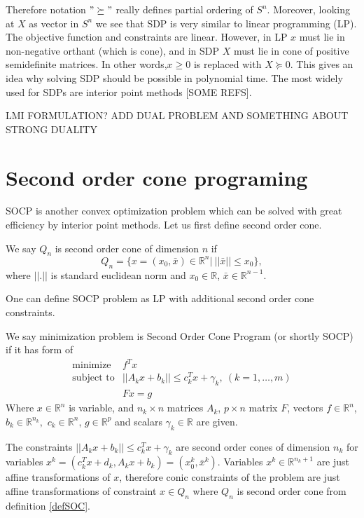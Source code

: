 \documentclass[10pt,oneside]{book}
\theoremstyle{definition}
\begin{document}
Therefore notation $"\succeq"$ really defines partial ordering of $S^n$. 
Moreover, looking at $X$ as vector in $S^n$ we see that SDP is very similar to linear programming (LP). The objective function and constraints are linear. However, in LP $x$ must lie in non-negative orthant (which is cone), and in SDP $X$ must lie in cone of positive semidefinite matrices. In other words,$x\geq 0$ is replaced with $X\succeq 0$. 
This gives an idea why solving SDP should be possible in polynomial time. The most widely used for SDPs are interior point methods [SOME REFS].

LMI FORMULATION?
ADD DUAL PROBLEM AND SOMETHING ABOUT STRONG DUALITY 

\section{Second order cone programing}



SOCP is another convex optimization problem which can be solved with great efficiency by interior point methods. Let us first define second order cone.

\label{defSOC} We say $Q_n$ is second order cone of dimension $n$ if 
$$Q_n=\{x = (x_0,\bar{x}) \in \mathbb{R}^n|\ ||\bar{x}||\leq x_0\},$$
where $||.|| $ is standard euclidean norm and $x_0\in \mathbb{R}$, $\bar{x}\in \mathbb{R}^{n-1}$.

One can define SOCP problem as LP with additional second order cone constraints.

\label{defSOCP}
We say minimization problem is Second Order Cone Program (or shortly SOCP) if it has form of
\begin{equation}
\label{socp} 
\begin{array}{ll}
\mbox{minimize} & f^Tx\\
\mbox{subject to}& ||A_kx+b_k|| \leq c_k^Tx + \gamma_k, \ (k = 1,\dots ,m) \\
& Fx = g
\end{array} 
\end{equation}
Where $x\in \mathbb{R}^n$ is variable, and $n_k\times n$ matrices $A_k$, $p\times n$ matrix $F$, vectors $f\in \mathbb{R}^n$, $b_k\in \mathbb{R}^{n_k},$ $c_k\in \mathbb{R}^n$, $g\in \mathbb{R}^p$ and scalars $\gamma_k\in \mathbb{R}$ are given.

The constraints $||A_kx+b_k|| \leq c_k^Tx + \gamma_k$ are second order cones of dimension $n_k$ for variables $x^k=(c_k^Tx + d_k, A_kx+b_k)=(x^k_0,\bar{x}^k)$. Variables $x^k\in \mathbb{R}^{n_k+1}$ are just affine transformations of $x$, therefore conic constraints of the problem are just affine transformations of constraint $x\in Q_n$ where $Q_n$ is second order cone from definition \ref{defSOC}.
\end{document}
